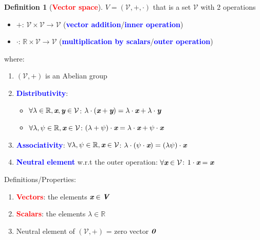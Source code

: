 \documentclass[12pt]{article}
\theoremstyle{definition}
\newtheorem{definition}{Definition}[section]
\newcommand{\keyword}[1]{\textbf{\textcolor{red}{#1}}}
\newcommand{\subkeyword}[1]{\textbf{\textcolor{blue}{#1}}}
\newcommand{\mat}[1]{\textit{\textbf{#1}}}
\begin{document}
        \begin{definition}[\keyword{Vector space}]
            $V=(\mathcal{V},+,\cdot)$ that is a set $\mathcal{V}$ with 2 operations
            \begin{itemize}
                \item $+$: $\mathcal{V}\times\mathcal{V}\rightarrow\mathcal{V}$ 
                    (\subkeyword{vector addition}/\subkeyword{inner operation})
                \item $\cdot$: $\mathbb{R}\times\mathcal{V}\rightarrow\mathcal{V}$ 
                    (\subkeyword{multiplication by scalars}/\subkeyword{outer operation})
            \end{itemize}
            where:
            \begin{enumerate}
                \item $(\mathcal{V},+)$ is an Abelian group
                \item \subkeyword{Distributivity}:
                    \begin{itemize}
                        \item $\forall\lambda\in\mathbb{R},\mat{x},\mat{y}\in\mathcal{V}$: 
                            $\lambda\cdot(\mat{x}+\mat{y})=\lambda\cdot\mat{x}+\lambda\cdot\mat{y}$
                        \item $\forall\lambda,\psi\in\mathbb{R},\mat{x}\in\mathcal{V}$: 
                            $(\lambda+\psi)\cdot\mat{x}=\lambda\cdot\mat{x}+\psi\cdot\mat{x}$
                    \end{itemize}
                \item \subkeyword{Associativity}: 
                    $\forall\lambda,\psi\in\mathbb{R},\mat{x}\in\mathcal{V}$: 
                    $\lambda\cdot(\psi\cdot\mat{x})=(\lambda\psi)\cdot\mat{x}$
                \item \subkeyword{Neutral element} w.r.t the outer operation:
                    $\forall\mat{x}\in\mathcal{V}$: $1\cdot\mat{x}=\mat{x}$
            \end{enumerate}
            Definitions/Properties:
            \begin{enumerate}
                \item \keyword{Vectors}: the elements $\mat{x}\in\mat{V}$
                \item \keyword{Scalars}: the elements $\lambda\in\mathbb{R}$
                \item Neutral element of $(\mathcal{V}, +)$ = zero vector $\mat{0}$
            \end{enumerate}
        \end{definition}
\end{document}

